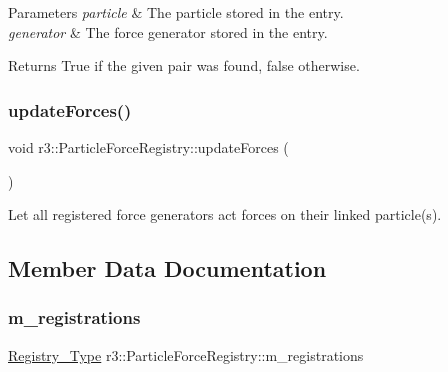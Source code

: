 \begin{DoxyParams}{Parameters}
{\em particle} & The particle stored in the entry. \\
\hline
{\em generator} & The force generator stored in the entry. \\
\hline
\end{DoxyParams}
\begin{DoxyReturn}{Returns}
True if the given pair was found, false otherwise. 
\end{DoxyReturn}
\mbox{\label{classr3_1_1_particle_force_registry_ac6a25ff71844b3655efe449b5144fdc5}} 
\subsubsection{\texorpdfstring{update\+Forces()}{updateForces()}}
{\footnotesize\ttfamily void r3\+::\+Particle\+Force\+Registry\+::update\+Forces (\begin{DoxyParamCaption}{ }\end{DoxyParamCaption})}



Let all registered force generators act forces on their linked particle(s). 



\subsection{Member Data Documentation}
\mbox{\label{classr3_1_1_particle_force_registry_ac0130d368fb6f3f8894bc83b615e193f}} 
\subsubsection{\texorpdfstring{m\+\_\+registrations}{m\_registrations}}
{\footnotesize\ttfamily \mbox{\hyperlink{classr3_1_1_particle_force_registry_ae769e654dbf539cf09c514e47768498c}{Registry\+\_\+\+Type}} r3\+::\+Particle\+Force\+Registry\+::m\+\_\+registrations\hspace{0.3cm}{\ttfamily [protected]}}



